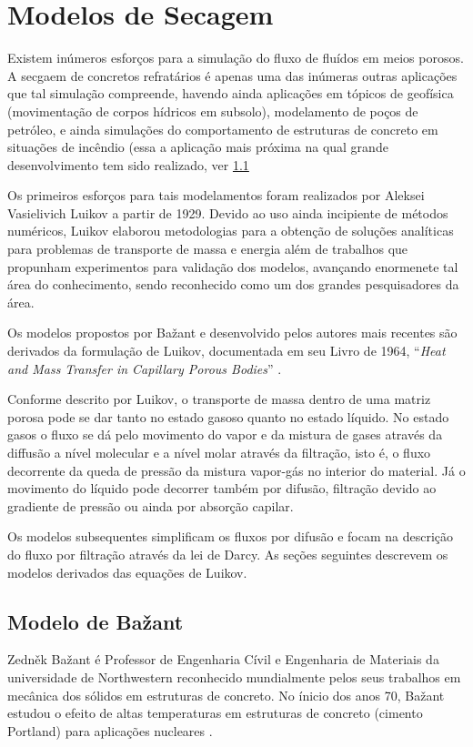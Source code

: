 \section{Modelos de Secagem}\label{modelos}
Existem inúmeros esforços para a simulação do fluxo de fluídos em meios porosos.
A secgaem de concretos refratários é apenas uma das inúmeras outras aplicações
que tal simulação compreende, havendo ainda aplicações em tópicos de geofísica
(movimentação de corpos hídricos em subsolo), modelamento de poços de petróleo,
e ainda simulações do comportamento de estruturas de concreto em situações de
incêndio (essa a aplicação mais próxima na qual grande desenvolvimento tem sido
realizado, ver \ref{sec:bazant}


Os primeiros esforços para tais modelamentos foram realizados por Aleksei Vasielivich Luikov
\cite{martynenko2010} a partir de 1929. Devido ao uso ainda incipiente de
métodos numéricos, Luikov elaborou metodologias para a obtenção de soluções
analíticas para problemas de transporte de massa e energia além de trabalhos que
propunham experimentos para validação dos modelos, avançando enormenete tal área
do conhecimento, sendo reconhecido como um dos grandes pesquisadores da área.

Os modelos propostos por Ba\v{z}ant e desenvolvido pelos autores mais recentes são
derivados da formulação de Luikov, documentada em seu Livro de 1964, ``\textit{Heat and
Mass Transfer in Capillary Porous Bodies}''
\cite{luikov1964heat}.

    Conforme descrito por Luikov, o transporte de massa dentro de uma matriz
    porosa pode se dar tanto no estado gasoso quanto no estado líquido. No
    estado gasos o fluxo se dá pelo movimento do vapor e da mistura de gases
    através da diffusão a nível molecular e a nível molar através da filtração,
    isto é, o fluxo decorrente da queda de pressão da mistura vapor-gás no
    interior do material. Já o movimento do líquido pode decorrer também por
    difusão, filtração devido ao gradiente de pressão ou ainda por absorção
    capilar.

    Os modelos subsequentes simplificam os fluxos por difusão e focam na
    descrição do fluxo por filtração através da lei de Darcy. As seções
    seguintes descrevem os modelos derivados das equações de Luikov.
    
    
    
    \subsection{Modelo de Ba\v{z}ant}\label{sec:bazant}
    Zedn\v{e}k Ba\v{z}ant é Professor de Engenharia Cívil e Engenharia de
    Materiais da universidade de Northwestern reconhecido mundialmente pelos
    seus trabalhos em  mecânica dos sólidos em estruturas de concreto. No ínicio
    dos anos 70, Ba\v{z}ant estudou o efeito de altas temperaturas em estruturas
    de concreto (cimento Portland) para aplicações nucleares \cite{bundesen2004biography}.
    
